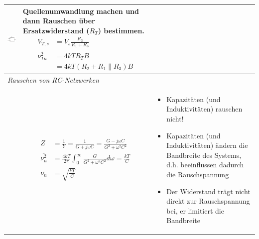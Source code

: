 \begin{longtable}[t]{|p{4cm}|p{5.2cm}|p{7cm}|}
    \includegraphics[width=4cm]{pictures/seriewiderstand2.png}
    & {Quellenumwandlung machen und dann Rauschen über Ersatzwiderstand ($R_T$) bestimmen.\newline
       \begin{align*}
           V_{T,s}&=V_{s}\frac{R_{3}}{R_{1}+R_{3}}\\
           \overline{\nu^2_{Tn}}&=4kTR_{T}B\\
           &=4kT(R_{2}+R_{1}\parallel R_{3})B
       \end{align*}
      }
    & {
      }
    \\ \hline
    \multicolumn{3}{|l|}{\textit{Rauschen von RC-Netzwerken}}
    \\ \hdashline
    \begin{center}  \end{center}
    & { \vspace{-1.5\topsep}
        \begin{align*}
            Z &=\frac{1}{Y}=\frac{1}{G+j\omega C}=\frac{G-j\omega C}{G^2+\omega^2C^2}\\
            \overline{\nu^2_{n}} &=\frac{4kT}{2\pi}\int^{\infty}_{0}\frac{G}{G^2+\omega^2C^2}d\omega=\frac{kT}{C}\\
            \overline{\nu_{n}} &=\sqrt{\frac{kT}{C}}
        \end{align*}
      }
    & {\vspace{-1.5\topsep}
        \begin{itemize}[leftmargin=*]
            \item Kapazitäten (und Induktivitäten) rauschen nicht!
            \item Kapazitäten (und Induktivitäten) ändern die Bandbreite des Systems, d.h. beeinflussen dadurch die Rauschspannung
            \item Der Widerstand trägt nicht direkt zur Rauschspannung bei, er limitiert die Bandbreite
            \newline
        \end{itemize}
      }
    \\ \hline
\end{longtable}
